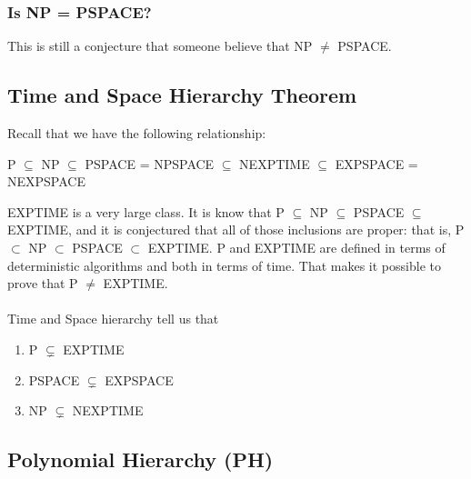 \documentclass[12pt]{article}
\begin{document}
\subsubsection{Is NP = PSPACE?}

This is still a conjecture that someone believe that NP $\ne$ PSPACE.

\subsection{Time and Space Hierarchy Theorem}

Recall that we have the following relationship:
\begin{center}
    P $\subseteq$ NP $\subseteq$ PSPACE = NPSPACE $\subseteq$ NEXPTIME $\subseteq$ EXPSPACE = NEXPSPACE
\end{center}

\noindent EXPTIME is a very large class. It is know that P $\subseteq$ NP $\subseteq$ PSPACE $\subseteq$ EXPTIME, and it is conjectured that all of those inclusions are proper: that is, P $\subset$ NP $\subset$ PSPACE $\subset$ EXPTIME. P and EXPTIME are defined in terms of deterministic algorithms and both in terms of time. That makes it possible to prove that P $\ne$ EXPTIME.
\\
\\
Time and Space hierarchy tell us that
\begin{enumerate}
    \item P $\subsetneq$ EXPTIME
    \item PSPACE $\subsetneq$ EXPSPACE
    \item NP $\subsetneq$ NEXPTIME
\end{enumerate}

\subsection{Polynomial Hierarchy (PH)}
\end{document}
